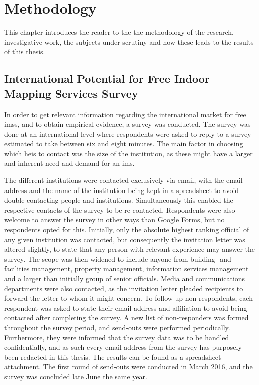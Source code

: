 \chapter{Methodology}
This chapter introduces the reader to the the methodology of the research, investigative work, the subjects under scrutiny and how these leads to the results of this thesis.

\section{International Potential for Free Indoor Mapping Services Survey}
In order to get relevant information regarding the international market for free \glspl{ims}, and to obtain empirical evidence, a survey was conducted. The survey was done at an international level where respondents were asked to reply to a survey estimated to take between six and eight minutes. The main factor in choosing which \glspl{hei} to contact was the size of the institution, as these might have a larger and inherent need and demand for an \gls{ims}. 


The different institutions were contacted exclusively via email, with the email address and the name of the institution being kept in a spreadsheet to avoid double-contacting people and institutions. Simultaneously this enabled the respective contacts of the survey to be re-contacted. Respondents were also welcome to answer the survey in other ways than Google Forms, but no respondents opted for this. Initially, only the absolute highest ranking official of any given institution was contacted, but consequently the invitation letter was altered slightly, to state that any person with relevant experience may answer the survey. The scope was then widened to include anyone from building- and facilities management, property management, information services management and a larger than initially group of senior officials. Media and communications departments were also contacted, as the invitation letter pleaded recipients to forward the letter to whom it might concern. To follow up non-respondents, each respondent was asked to state their email address and affiliation to avoid being contacted after completing the survey. A new list of non-responders was formed throughout the survey period, and send-outs were performed periodically. Furthermore, they were informed that the survey data was to be handled confidentially, and as such every email address from the survey has purposely been redacted in this thesis. The results can be found as a spreadsheet attachment. The first round of send-outs were conducted in March 2016, and the survey was concluded late June the same year. 


